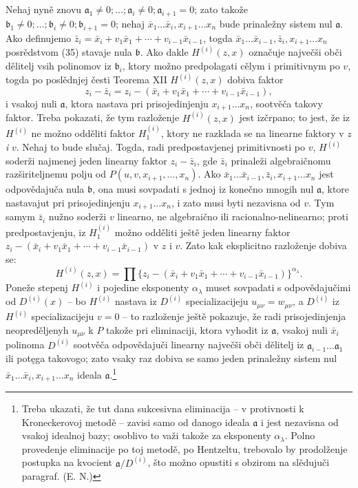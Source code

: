 \documentclass[11pt]{article}
\providecommand{\aideal}{\mathfrak a}
\providecommand{\bideal}{\mathfrak b}
\begin{document}
Nehaj nyně znovu $\aideal_1\ne0;\ldots;\aideal_i\ne0;\aideal_{i+1}=0$; zato takože $\bideal_1\ne0;\ldots;\bideal_i\ne0;\bideal_{i+1}=0$; nehaj $\bar x_1\ldots\bar x_i,x_{i+1}\ldots x_n$ bude prinaležny sistem nul $\aideal$. Ako definujemo $\bar z_i=\bar x_i+v_1\bar x_1+\cdots+v_{i-1}\bar x_{i-1}$, togda $\bar x_1\ldots\bar x_{i-1},\bar z_i,x_{i+1}\ldots x_n$ posrědstvom (35) stavaje nula $\bideal$. Ako dakle $H^{(i)}(z,x)$ označuje največši obči dělitelj vsih polinomov iz $\bideal_i$, ktory možno predpolagati cělym i primitivnym po $v$, togda po poslědnjej česti Teorema XII $H^{(i)}(z,x)$ dobiva faktor
\[
 z_i-\bar z_i=z_i-(\bar x_i+v_1\bar x_1+\cdots+v_{i-1}\bar x_{i-1}),
\]
i vsakoj nuli $\aideal$, ktora nastava pri prisojedinjenju $x_{i+1}\ldots x_n$, sootvěča takovy faktor. Treba pokazati, že tym razloženje $H^{(i)}(z,x)$ jest izčrpano; to jest, že iz $H^{(i)}$ ne možno odděliti faktor $H^{(i)}_1$, ktory ne razklada se na linearne faktory v $z$ \emph{i} $v$. Nehaj to bude slučaj. Togda, radi predpostavjenej primitivnosti po $v$, $H^{(i)}$ soderži najmenej jeden linearny faktor $z_i-\bar z_i$, gde $\bar z_i$ prinaleži algebraičnomu razširiteljnemu polju od $P(u,v,x_{i+1},\ldots,x_n)$. Ako $\bar x_1\ldots\bar x_{i-1},\bar z_i,x_{i+1}\ldots x_n$ jest odpovědajuča nula $\bideal$, ona musi sovpadati s jednoj iz konečno mnogih nul $\aideal$, ktore nastavajut pri prisojedinjenju $x_{i+1}\ldots x_n$, i zato musi byti nezavisna od $v$. Tym samym $\bar z_i$ nužno soderži $v$ linearno, ne algebraično ili racionalno-nelinearno; proti predpostavjenju, iz $H^{(i)}_1$ možno odděliti ještě jeden linearny faktor $z_i-(\bar x_i+v_1\bar x_1+\cdots+v_{i-1}\bar x_{i-1})$ v $z$ i $v$. Zato kak eksplicitno razloženje dobiva se:
\[
 H^{(i)}(z,x)=\prod \{z_i-(\bar x_i+v_1\bar x_1+\cdots+v_{i-1}\bar x_{i-1})\}^{\alpha_\lambda}.
\]
Poneže stepenj $H^{(i)}$ i pojedine eksponenty $\alpha_\lambda$ muset sovpadati s odpovědajučimi od $D^{(i)}(x)$ -- bo $H^{(i)}$ nastava iz $D^{(i)}$ specializacijeju $u_{\mu\nu}=w_{\mu\nu}$, a $D^{(i)}$ iz $H^{(i)}$ specializacijeju $v=0$ -- to razloženje ještě pokazuje, že radi prisojedinjenja neopreděljenyh $u_{\mu\nu}$ k $P$ takože pri eliminaciji, ktora vyhodit iz $\aideal$, vsakoj nuli $\bar x_i$ polinoma $D^{(i)}$ sootvěča odpovědajuči linearny največši obči dělitelj iz $\aideal_{i-1}\ldots\aideal_1$ ili potęga takovogo; zato vsaky raz dobiva se samo jeden prinaležny sistem nul $\bar x_1\ldots\bar x_i,x_{i+1}\ldots x_n$ ideala $\aideal$.\footnote{Treba ukazati, že tut dana sukcesivna eliminacija -- v protivnosti k Kroneckerovoj metodě -- zavisi samo od danogo ideala $\aideal$ i jest nezavisna od vsakoj idealnoj bazy; osoblivo to važi takože za eksponenty $\alpha_\lambda$. Polno provedenje eliminacije po toj metodě, po Hentzeltu, trebovalo by prodolženje postupka na kvocient $\aideal/D^{(i)}$, što možno opustiti s obzirom na slědujuči paragraf. (E. N.)}
\end{document}
